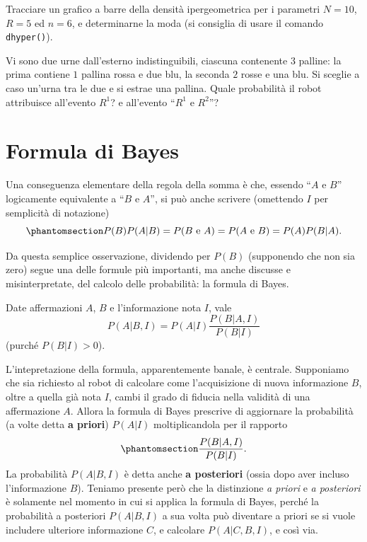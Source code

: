 \documentclass[
  italian,
  letterpaper,
]{book}
\theoremstyle{definition}
\theoremstyle{remark}
\begin{document}
Tracciare un grafico a barre della densità ipergeometrica per i
parametri \(N=10\), \(R= 5\) ed \(n=6\), e determinarne la moda (si
consiglia di usare il comando \texttt{dhyper()}).

Vi sono due urne dall'esterno indistinguibili, ciascuna contenente \(3\)
palline: la prima contiene \(1\) pallina rossa e due blu, la seconda
\(2\) rosse e una blu. Si sceglie a caso un'urna tra le due e si estrae
una pallina. Quale probabilità il robot attribuisce all'evento \(R^1\)?
e all'evento ``\(R^1 \text{ e } R^2\)''?

\section{Formula di Bayes}\label{sec-bayes}

Una conseguenza elementare della regola della somma è che, essendo
``\(A\) e \(B\)'' logicamente equivalente a ``\(B\) e \(A\)'', si può
anche scrivere (omettendo \(I\) per semplicità di notazione)
\begin{equation}\protect\phantomsection\label{eq-rapportosym}{
P( B ) P(A|B) = P(B \text{ e } A ) = P(A \text{ e } B) = P(A) P(B|A). 
}\end{equation}

Da questa semplice osservazione, dividendo per \(P(B)\) (supponendo che
non sia zero) segue una delle formule più importanti, ma anche discusse
e misinterpretate, del calcolo delle probabilità: la formula di Bayes.

Date affermazioni \(A\), \(B\) e l'informazione nota \(I\), vale
\[ P( A | B, I ) = P(A | I ) \frac{ P(B | A,I)}{P(B|I)}\] (purché
\(P(B|I)>0\)).

L'intepretazione della formula, apparentemente banale, è centrale.
Supponiamo che sia richiesto al robot di calcolare come l'acquisizione
di nuova informazione \(B\), oltre a quella già nota \(I\), cambi il
grado di fiducia nella validità di una affermazione \(A\). Allora la
formula di Bayes prescrive di aggiornare la probabilità (a volte detta
\textbf{a priori}) \(P(A|I)\) moltiplicandola per il rapporto
\begin{equation}\protect\phantomsection\label{eq-rapportobayes}{
\frac{ P(B | A,I)}{P(B|I)}.  
}\end{equation} La probabilità \(P(A|B,I)\) è detta anche \textbf{a
posteriori} (ossia dopo aver incluso l'informazione \(B\)). Teniamo
presente però che la distinzione \emph{a priori} e \emph{a posteriori} è
solamente nel momento in cui si applica la formula di Bayes, perché la
probabilità a posteriori \(P(A|B,I)\) a sua volta può diventare a priori
se si vuole includere ulteriore informazione \(C\), e calcolare
\(P(A|C,B,I)\), e così via.
\end{document}
